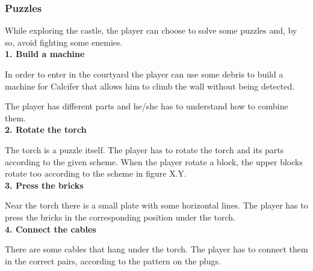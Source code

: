 \subsubsection{Puzzles}
While exploring the castle, the player can choose to solve some puzzles and, by so, avoid fighting some enemies. \\

\textbf{1. Build a machine}

In order to enter in the courtyard the player can use some debris to build a machine for Calcifer that allows him to climb the wall without being detected.

The player has different parts and he/she has to understand how to combine them.\\

\textbf{2. Rotate the torch}

The torch is a puzzle itself. The player has to rotate the torch and its parts according to the given scheme. When the player rotate a block, the upper blocks rotate too according to the scheme in figure X.Y.\\

\textbf{3. Press the bricks}

Near the torch there is a small plate with some horizontal lines. The player has to press the bricks in the corresponding position under the torch.\\

\textbf{4. Connect the cables}

There are some cables that hang under the torch. The player has to connect them in the correct pairs, according to the pattern on the plugs.
